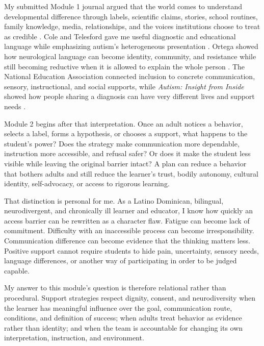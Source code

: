 
My submitted Module 1 journal argued that the world comes to understand developmental difference through labels, scientific claims, stories, school routines, family knowledge, media, relationships, and the voices institutions choose to treat as credible \citep{garciabautista2026module1}. Cole and Telesford gave me useful diagnostic and educational language while emphasizing autism's heterogeneous presentation \citep{cole2023autism}. Ortega showed how neurological language can become identity, community, and resistance while still becoming reductive when it is allowed to explain the whole person \citep{ortega2013cerebralizing}. The National Education Association connected inclusion to concrete communication, sensory, instructional, and social supports, while \textit{Autism: Insight from Inside} showed how people sharing a diagnosis can have very different lives and support needs \citep{nea2020guide,infobase2016inside}.

Module 2 begins after that interpretation. Once an adult notices a behavior, selects a label, forms a hypothesis, or chooses a support, what happens to the student's power? Does the strategy make communication more dependable, instruction more accessible, and refusal safer? Or does it make the student less visible while leaving the original barrier intact? A plan can reduce a behavior that bothers adults and still reduce the learner's trust, bodily autonomy, cultural identity, self-advocacy, or access to rigorous learning.

That distinction is personal for me. As a Latino Dominican, bilingual, neurodivergent, and chronically ill learner and educator, I know how quickly an access barrier can be rewritten as a character flaw. Fatigue can become lack of commitment. Difficulty with an inaccessible process can become irresponsibility. Communication difference can become evidence that the thinking matters less. Positive support cannot require students to hide pain, uncertainty, sensory needs, language differences, or another way of participating in order to be judged capable.

My answer to this module's question is therefore relational rather than procedural. Support strategies respect dignity, consent, and neurodiversity when the learner has meaningful influence over the goal, communication route, conditions, and definition of success; when adults treat behavior as evidence rather than identity; and when the team is accountable for changing its own interpretation, instruction, and environment.
